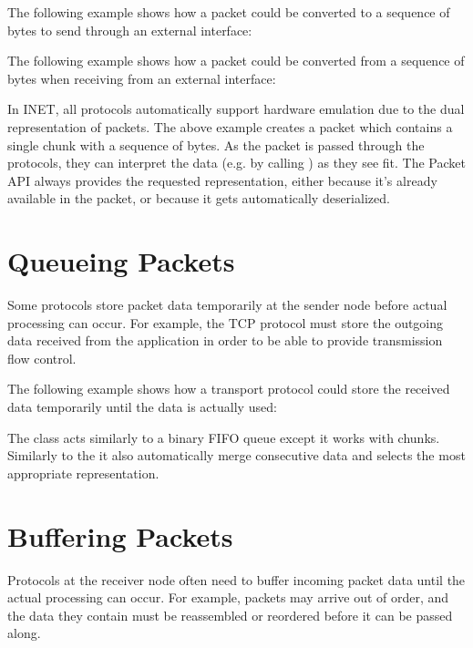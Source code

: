 The following example shows how a packet could be converted to a sequence of
bytes to send through an external interface:


The following example shows how a packet could be converted from a sequence of
bytes when receiving from an external interface:


In INET, all protocols automatically support hardware emulation due to the dual
representation of packets. The above example creates a packet which contains a
single chunk with a sequence of bytes. As the packet is passed through the
protocols, they can interpret the data (e.g. by calling ) as
they see fit. The Packet API always provides the requested representation,
either because it's already available in the packet, or because it gets
automatically deserialized.

\section{Queueing Packets}

Some protocols store packet data temporarily at the sender node before actual
processing can occur. For example, the TCP protocol must store the outgoing data
received from the application in order to be able to provide transmission flow
control.

The following example shows how a transport protocol could store the received
data temporarily until the data is actually used:


The  class acts similarly to a binary FIFO queue except it
works with chunks. Similarly to the  it also automatically
merge consecutive data and selects the most appropriate representation.

\section{Buffering Packets}

Protocols at the receiver node often need to buffer incoming packet data until
the actual processing can occur. For example, packets may arrive out of order,
and the data they contain must be reassembled or reordered before it can be
passed along.

